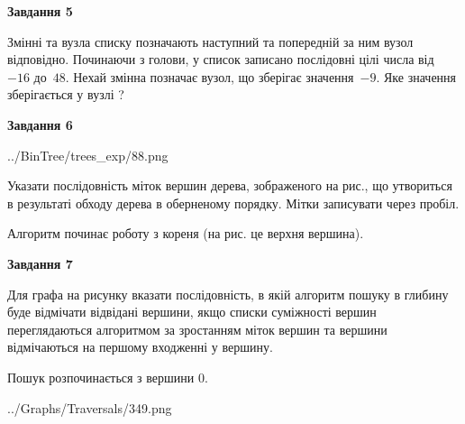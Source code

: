 \documentclass[12pt, ukrainian]{article}
\begin{document}
{\begin {large}
{\begin {center}\textbf{Завдання 5}\end {center}}\par
Змінні  та  вузла списку позначають наступний та попередній за ним вузол відповідно. Починаючи з голови, у список записано послідовні цілі числа від~$-16$ до~$48$. Нехай змінна  позначає вузол, що зберігає значення~$-9$.
Яке значення зберігається у вузлі  ?\par
\newpage

{\begin {center}\textbf{Завдання 6}\end {center}}\par

\begin{center}
	{../BinTree/trees_exp/88.png}
\end{center}
Указати послідовність міток вершин дерева, зображеного на рис., що утвориться в результаті обходу дерева в оберненому порядку. Мітки записувати через пробіл.\par Алгоритм починає роботу з кореня (на рис. це верхня вершина).\par
\newpage

{\begin {center}\textbf{Завдання 7}\end {center}}\par
Для графа на рисунку вказати послідовність, в якій алгоритм пошуку в глибину буде відмічати відвідані вершини, якщо списки суміжності вершин переглядаються алгоритмом за зростанням міток вершин та вершини відмічаються на першому вход\-женні у вершину.\par
Пошук розпочинається з вершини 0.\par

\begin{center}
	{../Graphs/Traversals/349.png}
\end{center}\par
\newpage


\end{large}}
\end{document}
